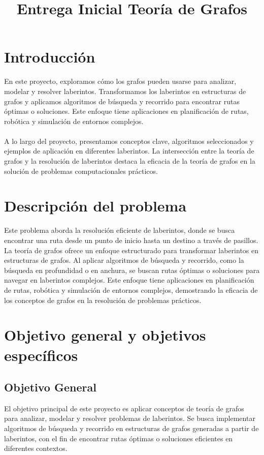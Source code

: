 \documentclass[conference]{IEEEtran}
\title{Entrega Inicial Teoría de Grafos}
\author{
	\IEEEauthorblockN{Juan Sebastian Pedraza Guevara }
	\IEEEauthorblockA{\textit{Escuela de Ingeniería Ciencia y Tecnología} \\
		\textit{Matemáticas Aplicadas y Ciencias de la Computación}\\
		\textit{Universidad del Rosario}\\
		Bogotá , Colombia\\
	}
	
	
}
\begin{document}
	
	\maketitle
	
	
	\section{Introducción}
	En este proyecto, exploramos cómo los grafos pueden usarse para analizar, modelar y resolver laberintos. Transformamos los laberintos en estructuras de grafos y aplicamos algoritmos de búsqueda y recorrido para encontrar rutas óptimas o soluciones. Este enfoque tiene aplicaciones en planificación de rutas, robótica y simulación de entornos complejos. 
	\\ 
	\\
	A lo largo del proyecto, presentamos conceptos clave, algoritmos seleccionados y ejemplos de aplicación en diferentes  laberintos. La intersección entre la teoría de grafos y la resolución de laberintos destaca la eficacia de la teoría de grafos en la solución de problemas computacionales prácticos.
	
	\section{Descripción del problema}
	Este problema aborda la resolución eficiente de laberintos, donde se busca encontrar una ruta desde un punto de inicio hasta un destino a través de pasillos. La teoría de grafos ofrece un enfoque estructurado para transformar laberintos en estructuras de grafos. Al aplicar algoritmos de búsqueda y recorrido, como la búsqueda en profundidad o en anchura, se buscan rutas óptimas o soluciones para navegar en laberintos complejos. Este enfoque tiene aplicaciones en planificación de rutas, robótica y simulación de entornos complejos, demostrando la eficacia de los conceptos de grafos en la resolución de problemas prácticos.
	\section{Objetivo general y objetivos específicos}
	\subsection{Objetivo General}
	El objetivo principal de este proyecto es aplicar conceptos de teoría de grafos para analizar, modelar y resolver problemas de laberintos. Se busca implementar algoritmos de búsqueda y recorrido en estructuras de grafos generadas a partir de laberintos, con el fin de encontrar rutas óptimas o soluciones eficientes en diferentes contextos.
	\\
	\\
\end{document}
